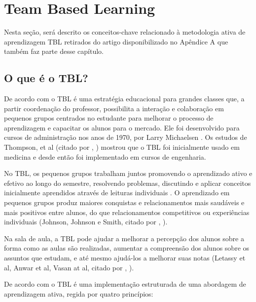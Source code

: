 \section{Team Based Learning}

Nesta seção, será descrito os conceitos-chave relacionado à metodologia ativa de aprendizagem TBL retirados do artigo disponibilizado no Apêndice A que também faz parte desse capítulo.

\subsection{O que é o TBL?}

De acordo com \cite{burgess} o TBL é uma estratégia educacional para grandes classes que, a partir coordenação do professor, possibilita a interação e colaboração em pequenos grupos centrados no estudante para melhorar o processo de aprendizagem e capacitar os alunos para o mercado. Ele foi desenvolvido para cursos de administração nos anos de 1970, por Larry Michaelsen \cite{sweet}. Os estudos de Thompson, et al (citado por \citeauthor{matalonga}, \citeyear{matalonga}) mostrou que o TBL foi inicialmente usado em medicina e desde então foi implementado em cursos de engenharia.

No TBL, os pequenos grupos trabalham juntos promovendo o aprendizado ativo e efetivo ao longo do semestre, resolvendo problemas, discutindo e aplicar conceitos inicialmente aprendidos através de leituras individuais \cite{gomez}. O aprendizado em pequenos grupos produz maiores conquistas e relacionamentos mais saudáveis e mais positivos entre alunos, do que relacionamentos competitivos ou experiências individuais (Johnson, Johnson e Smith, citado por \citeauthor{gomez}, \citeyear{gomez}).

Na sala de aula, a TBL pode ajudar a melhorar a percepção dos alunos sobre a forma como as aulas são realizadas, aumentar a compreensão dos alunos sobre os assuntos que estudam, e até mesmo ajudá-los a melhorar suas notas (Letassy et al, Anwar et al, Vasan at al, citado por \citeauthor{cabrera}, \citeyear{cabrera}).

De acordo com \cite{sweet} o TBL é uma implementação estruturada de uma abordagem de aprendizagem ativa, regida por quatro princípios:

